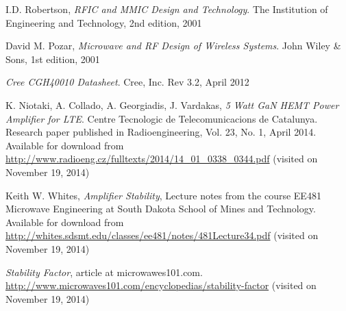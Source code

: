   \begin{thebibliography}{9}

		  I.D. Robertson, \emph{RFIC and MMIC Design and Technology}.
		  The Institution of Engineering and Technology,
		  2nd edition,
		  2001

		  David M. Pozar, \emph{Microwave and RF Design of Wireless Systems}.
		  John Wiley \& Sons,
		  1st edition,
		  2001

		  \emph{Cree CGH40010 Datasheet}.
		  Cree, Inc. 
		  Rev 3.2,
		  April 2012

		  K. Niotaki, A. Collado, A. Georgiadis, J. Vardakas, \emph{5 Watt GaN HEMT Power Amplifier for LTE}.
		  Centre Tecnologic de Telecomunicacions de Catalunya.
		  Research paper published in Radioengineering, Vol. 23, No. 1, April 2014. Available for download from \url{http://www.radioeng.cz/fulltexts/2014/14_01_0338_0344.pdf} (visited on November 19, 2014)

		  Keith W. Whites, \emph{Amplifier Stability}, Lecture notes from the course EE481 Microwave Engineering at South Dakota School of Mines and Technology.
		  Available for download from \url{http://whites.sdsmt.edu/classes/ee481/notes/481Lecture34.pdf} (visited on November 19, 2014)

		  \emph{Stability Factor}, article at microwawes101.com. \url{http://www.microwaves101.com/encyclopedias/stability-factor} (visited on November 19, 2014)

  \end{thebibliography}

